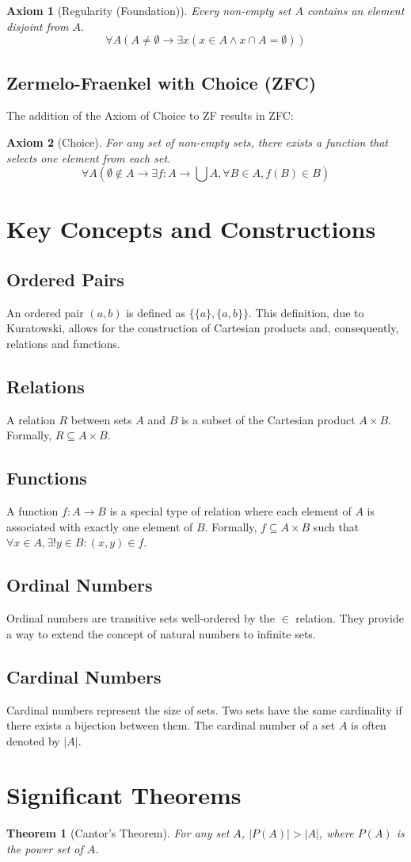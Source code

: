\documentclass[12pt,a4paper]{article}
\newtheorem{axiom}{Axiom}
\newtheorem{theorem}{Theorem}
\newcommand{\sectiontitle}[1]{\section{\textcolor{draculaPurple}{#1}}}
\newcommand{\subsectiontitle}[1]{\subsection{\textcolor{draculaPink}{#1}}}
\begin{document}
\begin{axiom}[Regularity (Foundation)]
Every non-empty set $A$ contains an element disjoint from $A$.
\[ \forall A (A \neq \emptyset \rightarrow \exists x (x \in A \land x \cap A = \emptyset)) \]
\end{axiom}

\subsectiontitle{Zermelo-Fraenkel with Choice (ZFC)}

The addition of the Axiom of Choice to ZF results in ZFC:

\begin{axiom}[Choice]
For any set of non-empty sets, there exists a function that selects one element from each set.
\[ \forall A (\emptyset \notin A \rightarrow \exists f:A \rightarrow \bigcup A, \forall B \in A, f(B) \in B) \]
\end{axiom}

\sectiontitle{Key Concepts and Constructions}

\subsectiontitle{Ordered Pairs}

An ordered pair $(a, b)$ is defined as $\{\{a\}, \{a, b\}\}$. This definition, due to Kuratowski, allows for the construction of Cartesian products and, consequently, relations and functions.

\subsectiontitle{Relations}

A relation $R$ between sets $A$ and $B$ is a subset of the Cartesian product $A \times B$. Formally, $R \subseteq A \times B$.

\subsectiontitle{Functions}

A function $f: A \rightarrow B$ is a special type of relation where each element of $A$ is associated with exactly one element of $B$. Formally, $f \subseteq A \times B$ such that $\forall x \in A, \exists! y \in B : (x, y) \in f$.

\subsectiontitle{Ordinal Numbers}

Ordinal numbers are transitive sets well-ordered by the $\in$ relation. They provide a way to extend the concept of natural numbers to infinite sets.

\subsectiontitle{Cardinal Numbers}

Cardinal numbers represent the size of sets. Two sets have the same cardinality if there exists a bijection between them. The cardinal number of a set $A$ is often denoted by $|A|$.

\sectiontitle{Significant Theorems}

\begin{theorem}[Cantor's Theorem]
For any set $A$, $|P(A)| > |A|$, where $P(A)$ is the power set of $A$.
\end{theorem}
\end{document}
